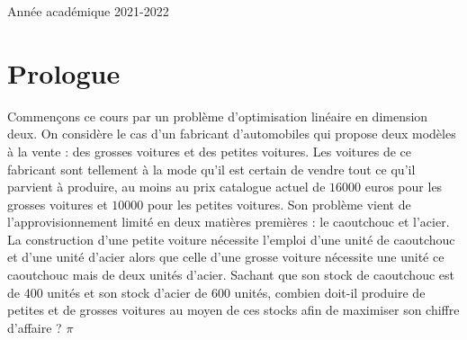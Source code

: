 \documentclass[a4paper, 11pt,openany]{book}%
\newtheorem[L]{thm}{Théorème}[section]
\newtheorem[M]{propo}[thm]{Proposition}
\newtheorem[M]{prop}[thm]{Propriété}
\newtheorem[M]{coro}[thm]{Corollaire}
\newtheorem[M]{lem}[thm]{Lemme}
\newtheorem[M,bodystyle=]{defi}[thm]{Définition}
\newtheorem[M,bodystyle=]{remark}[thm]{Remarque}
\newtheorem[M,bodystyle=]{met}[thm]{Méthode}
\newtheorem[M,bodystyle=]{ret}[thm]{A retenir}
\newtheorem[M,bodystyle=]{idee}[thm]{Idée}
\newtheorem[style=S,underline=false,bodystyle=]{exem}[thm]{Exemple}
\newtheorem[S,underline=false,bodystyle=]{exo}[thm]{Exercice}
\newtheorem[S,underline=false,bodystyle=]{appli}[thm]{Application}
\newtheorem[S,underline=false,bodystyle=]{sol}[thm]{Solution}
\newtheorem[S,underline=false,bodystyle=]{hypo}[thm]{Hypothesis}
\newtheorem[S,underline=false,bodystyle=]{nota}[thm]{Notation}
\begin{document}
\begin{titlepage}
\begin{sffamily}
\begin{center}





    \vfill




    {\large Année académique 2021-2022}



  \end{center}

  \end{sffamily}

\end{titlepage}

%

%

%

%


   \tableofcontents

   \frontmatter

   

   \chapter{Prologue}

   Commençons ce cours par un problème d'optimisation linéaire en dimension deux. On considère le cas d'un fabricant d'automobiles qui propose deux modèles à la vente : des grosses voitures et des petites voitures. Les voitures de ce fabricant sont tellement à la mode qu'il est certain de vendre tout ce qu'il parvient à produire, au moins au prix catalogue actuel de $16000$ euros pour les grosses voitures et $10000$ pour les petites voitures. Son problème vient de l'approvisionnement limité en deux matières premières : le caoutchouc et l'acier. La construction d'une petite voiture nécessite l'emploi d'une unité de caoutchouc et d'une unité d'acier alors que celle d'une grosse voiture nécessite une unité ce caoutchouc mais de deux unités d'acier. Sachant que son stock de caoutchouc est de 400 unités et son stock d'acier de 600 unités, combien doit-il produire de petites et de grosses voitures au moyen de ces stocks afin de maximiser son chiffre d'affaire ? $\pi$
\end{document}
